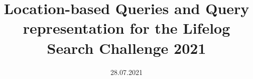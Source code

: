\documentclass[a4paper, 10pt, oneside]{memoir}
\title				{Location-based Queries and Query representation for the Lifelog Search Challenge 2021}
\date				{28.07.2021}
\begin{document}

\thesisfront
\maketitle
\pagestyle{thesis}
% 

\thesistoc
\thesismain




%
%
%
%
\thesisappendix
\thesisbib
\begin{appendices}
	 
\end{appendices}
\thesisback

\end{document}
